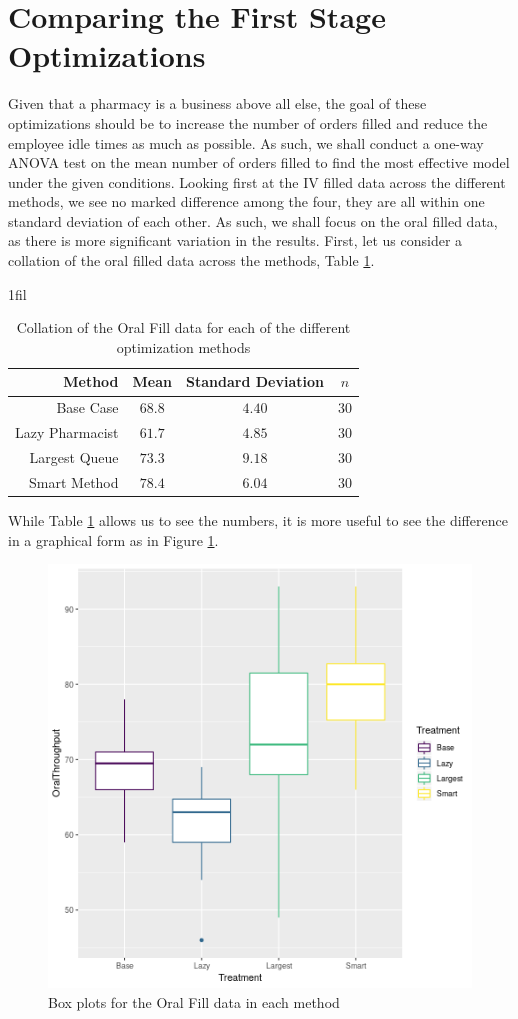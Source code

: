 \documentclass[10pt]{report}            %
\makeatletter
\newcommand*{\centerfloat}{%
  \parindent \z@
  \leftskip \z@ \@plus 1fil \@minus \textwidth
  \rightskip\leftskip
  \parfillskip \z@skip}
\makeatother
\begin{document}
\section*{Comparing the First Stage Optimizations}
Given that a pharmacy is a business above all else, the goal of these optimizations should be to increase the number of orders filled and reduce the employee idle times as much as possible. As such, we shall conduct a one-way ANOVA test on the mean number of orders filled to find the most effective model under the given conditions. Looking first at the IV filled data across the different methods, we see no marked difference among the four, they are all within one standard deviation of each other. As such, we shall focus on the oral filled data, as there is more significant variation in the results. First, let us consider a collation of the oral filled data across the methods, Table \ref{table:collate}.
\begin{table}[H]
\centerfloat
\begin{tabular}{|r||c|c|c|}
\hline
Method & Mean & Standard Deviation & $n$\\\hline\hline
Base Case & $68.8$ & $4.40$ & $30$\\\hline
Lazy Pharmacist & $61.7$ & $4.85$ & $30$\\\hline
Largest Queue & $73.3$ & $9.18$ & $30$\\\hline
Smart Method & $78.4$ & $6.04$ & $30$\\\hline
\end{tabular}
\caption{Collation of the Oral Fill data for each of the different optimization methods}
\label{table:collate}
\end{table}
While Table \ref{table:collate} allows us to see the numbers, it is more useful to see the difference in a graphical form as in Figure \ref{fig:anovaBox}.
\begin{figure}[H]
\centering
\includegraphics[scale=.5]{anovaBox.png}
\caption{Box plots for the Oral Fill data in each method}
\label{fig:anovaBox}
\end{figure}
\end{document}
